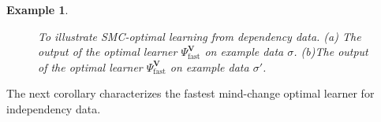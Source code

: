 \documentclass{elsarticle}%
\newtheorem{example}[theorem]{Example}
\newcommand{\fast}{\mathrm{fast}}
\begin{document}
\begin{example}
\begin{figure}[h]
{    }
    \hspace{3cm}

    \caption{To illustrate SMC-optimal learning from dependency data. (a) The output of the optimal learner $\Psi_{\fast}^{\mathbf{V}}$ on example data $\sigma$. (b)The output of the optimal learner $\Psi_{\fast}^{\mathbf{V}}$ on example data $\sigma'$.}
    \label{fig:outputs}
  \end{figure}
\end{example}
%
The next corollary characterizes the fastest mind-change optimal learner for independency data.
\end{document}
